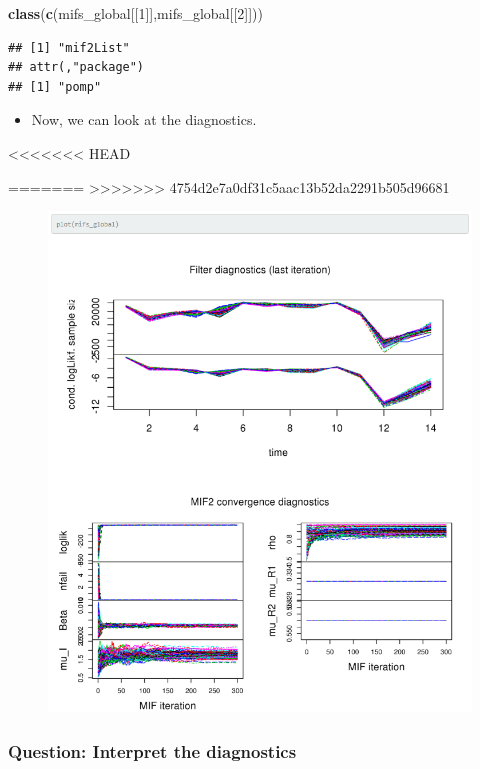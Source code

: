 \documentclass[]{article}
\newenvironment{Shaded}{\begin{snugshade}}{\end{snugshade}}
\newcommand{\KeywordTok}[1]{\textcolor[rgb]{0.13,0.29,0.53}{\textbf{#1}}}
\newcommand{\DecValTok}[1]{\textcolor[rgb]{0.00,0.00,0.81}{#1}}
\newcommand{\NormalTok}[1]{#1}
\providecommand{\tightlist}{%
  \setlength{\itemsep}{0pt}\setlength{\parskip}{0pt}}
\begin{document}
\begin{Shaded}
\begin{Highlighting}[]
\KeywordTok{class}\NormalTok{(}\KeywordTok{c}\NormalTok{(mifs_global[[}\DecValTok{1}\NormalTok{]],mifs_global[[}\DecValTok{2}\NormalTok{]]))}
\end{Highlighting}
\end{Shaded}

\begin{verbatim}
## [1] "mif2List"
## attr(,"package")
## [1] "pomp"
\end{verbatim}

\begin{itemize}
\tightlist
\item
  Now, we can look at the diagnostics.
\end{itemize}

<<<<<<< HEAD

=======
>>>>>>> 4754d2e7a0df31c5aac13b52da2291b505d96681
\begin{figure}[h!]
	\centering
	\includegraphics[width=0.9\linewidth]{figure/notes12-added_plot}
\end{figure}


\subsubsection{Question: Interpret the
diagnostics}\label{question-interpret-the-diagnostics}
\end{document}
